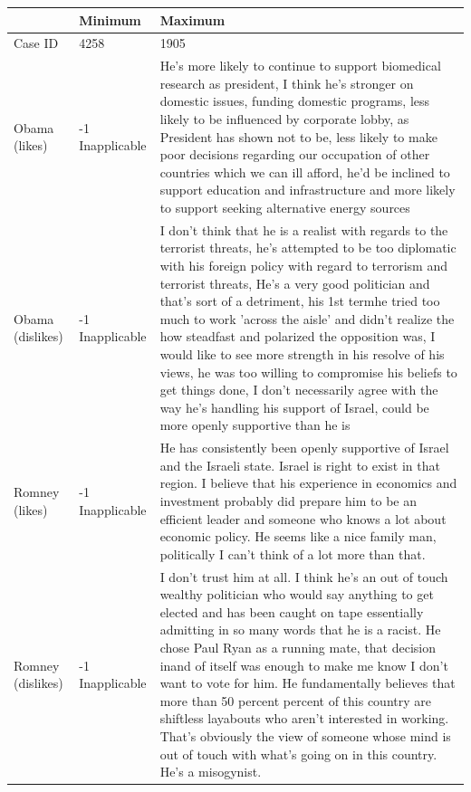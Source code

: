 \documentclass[12pt]{article}
\begin{document}
\begin{longtable}[ht]{p{1.4cm}lp{12cm}}
  \hline
 & Minimum & Maximum \\ 
  \hline
Case ID & 4258 & 1905 \\ 
  Obama (likes) & -1 Inapplicable & He's more likely to continue to support biomedical research as president, I think he's stronger on domestic issues, funding domestic programs, less likely to be influenced by corporate lobby, as President has shown not to be, less likely to make poor decisions regarding our occupation of other countries which we can ill afford, he'd be inclined to support education and infrastructure and more likely to support seeking alternative energy sources \\ 
  Obama (dislikes) & -1 Inapplicable & I don't think that he is a realist with regards to the terrorist threats, he's attempted to be too diplomatic with his foreign policy with regard to terrorism and terrorist threats, He's a very good politician and that's sort of a detriment, his 1st termhe tried too much to work 'across the aisle' and didn't realize the how steadfast and polarized the opposition was, I would like to see more strength in his resolve of his views, he was too willing to compromise his beliefs to get things done, I don't necessarily agree with the way he's handling his support of Israel, could be more openly supportive than he is \\ 
  Romney (likes) & -1 Inapplicable & He has consistently been openly supportive of Israel and the Israeli state.  Israel is right to exist in that region.  I believe that his experience in economics and investment probably did prepare him to be an efficient leader and someone who knows a lot about economic policy. He seems like a nice family man, politically I can't think of a lot more than that. \\ 
  Romney (dislikes) & -1 Inapplicable & I don't trust him at all. I think he's an out of touch wealthy politician who would say anything to get elected and has been caught on tape essentially admitting in so many words that he is a racist. He chose Paul Ryan as a running mate, that decision inand of itself was enough to make me know I don't want to vote for him. He fundamentally believes that more than 50 percent  percent of this country are shiftless layabouts who aren't interested in working.  That's obviously the view of someone whose mind is out of touch with what's going on in this country. He's a misogynist. \\ 

\end{longtable}
\end{document}
